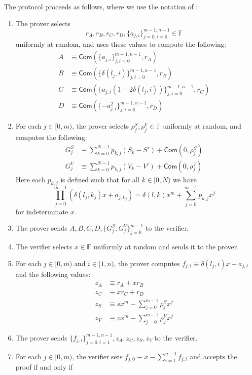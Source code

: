 \documentclass{llncs}
\newcommand{\F}{\mathbb{F}}
\newcommand{\func}[1]{\mathsf{#1}}
\newcommand{\com}{\func{Com}}
\begin{document}
The protocol proceeds as follows, where we use the notation of \cite{lelantus}:
\begin{enumerate}
    \item The prover selects $$r_A, r_B, r_C, r_D, \{a_{j,i}\}_{j=0,i=0}^{m-1,n-1} \in \F$$ uniformly at random, and uses these values to compute the following:
    \begin{align*}
        A &\equiv \com(\{a_{j,i}\}_{j,i=0}^{m-1,n-1}, r_A) \\
        B &\equiv \com(\{\delta(l_{j},i)\}_{j,i=0}^{m-1,n-1}, r_B) \\
        C &\equiv \com(\lbrace a_{j,i}(1-2\delta(l_j,i))\rbrace_{j,i=0}^{m-1,n-1}, r_C) \\
        D &\equiv \com(\{-a_{j,i}^2\}_{j,i=0}^{m-1,n-1}, r_D)
    \end{align*}
    \item For each $j \in [0,m)$, the prover selects $\rho^S_j, \rho^V_j \in \F$ uniformly at random, and computes the following:
    \begin{align*}
        G^S_j &\equiv \sum_{k=0}^{N-1}p_{k,j}(S_k - S') + \com(0, \rho^S_j) \\
        G^V_j &\equiv \sum_{k=0}^{N-1}p_{k,j}(V_k - V') + \com(0, \rho^V_j)
    \end{align*}
    Here each $p_{k,j}$ is defined such that for all $k \in [0,N)$ we have $$\prod_{j=0}^{m-1} \left( \delta(l_j,k_j)x + a_{j,k_j} \right) = \delta(l,k)x^m + \sum_{j=0}^{m-1} p_{k,j}x^j$$ for indeterminate $x$.
    \item The prover sends $A, B, C, D, \{G^S_j, G^V_j\}_{j=0}^{m-1}$ to the verifier.
    \item The verifier selects $x \in \F$ uniformly at random and sends it to the prover.
    \item For each $j \in [0,m)$ and $i \in [1,n)$, the prover computes $f_{j,i} \equiv \delta(l_{j},i)x + a_{j,i}$ and the following values:
    \begin{align*}
        z_A &\equiv r_A + xr_B \\
        z_C &\equiv xr_C + r_D \\
        z_S &\equiv sx^m -  \sum_{j=0}^{m-1}\rho^S_j x^j \\
        z_V &\equiv vx^m - \sum_{j=0}^{m-1}\rho^V_j x^j
    \end{align*}
    \item The prover sends $\{f_{j,i}\}_{j=0,i=1}^{m-1,n-1}, z_A, z_C, z_S, z_V$ to the verifier.
    \item For each $j \in [0,m)$, the verifier sets $f_{j,0} \equiv x - \sum_{i=1}^{n-1} f_{j,i}$ and accepts the proof if and only if

\end{enumerate}
\end{document}
